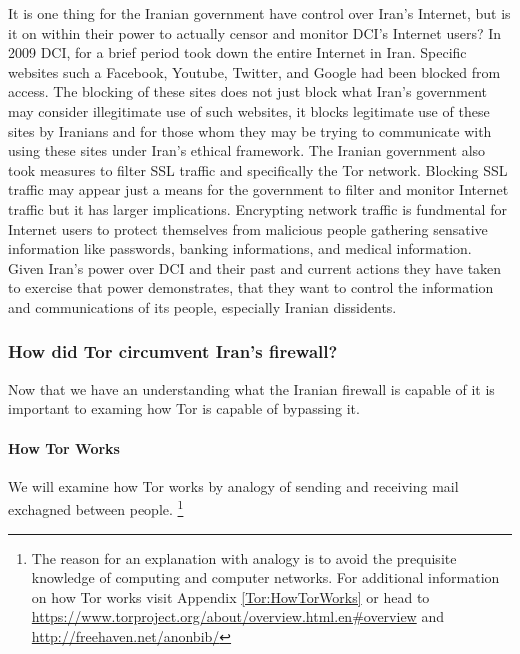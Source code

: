 \documentclass[11pt]{article}
\begin{document}
\begin{multicols}{2}
It is one thing for the Iranian government have control over Iran's
Internet, but is it on within their power to actually censor and monitor DCI's
Internet users? In 2009 DCI, for a brief period took down the entire Internet in 
Iran. \cite{FindingWayAroundIranianCensorship} Specific websites such a
Facebook, Youtube, Twitter, and Google had been blocked from access.
\cite{FindingWayAroundIranianCensorship, IransElectronicCurtain} The blocking of
these sites does not just block what Iran's government may consider illegitimate
use of such websites, it  blocks legitimate use of these sites by Iranians and
for those whom they may be trying to communicate with using these sites under
Iran's ethical framework. The Iranian government also took measures to filter
SSL traffic and specifically the Tor network.  \cite{Tor:IranPartiallyBlocksSSL,
IranBlocksTorSameDayFix} Blocking SSL traffic may appear just a means for the
government to filter and monitor Internet traffic but it has larger
implications. Encrypting network traffic is fundmental for Internet users to
protect themselves from malicious people gathering sensative information like
passwords, banking informations, and medical information. Given Iran's power
over DCI and their past and current actions they have taken to exercise that
power demonstrates, that they want to control the information and communications
of its people, especially Iranian dissidents.


\subsubsection{How did Tor circumvent Iran's firewall?}

Now that we have an understanding what the Iranian firewall is capable of it is
important to examing how Tor is capable of bypassing it.

\paragraph{How Tor Works}
\label{HowTorWorks}
We will examine how Tor works by analogy of sending and receiving mail 
exchagned between people. 
\footnote{The reason for an explanation with analogy is to avoid the prequisite
  knowledge of computing and computer networks. For additional information on how 
  Tor works visit Appendix \ref{Tor:HowTorWorks} or head to
  \url{https://www.torproject.org/about/overview.html.en#overview} and
\url{http://freehaven.net/anonbib/}
}


\end{multicols}
\end{document}
